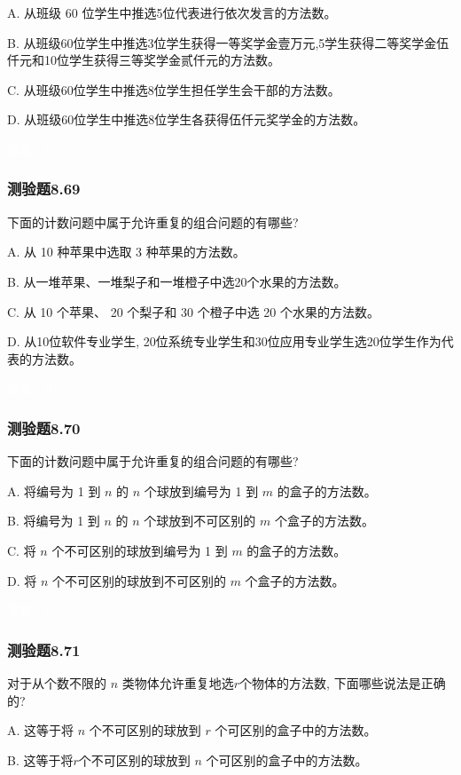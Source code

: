 \documentclass[UTF8, heading=true]{ctexart}
\begin{document}
A. 从班级 60 位学生中推选5位代表进行依次发言的方法数。

B. 从班级60位学生中推选3位学生获得一等奖学金壹万元,5学生获得二等奖学金伍仟元和10位学生获得三等奖学金贰仟元的方法数。

C. 从班级60位学生中推选8位学生担任学生会干部的方法数。

D. 从班级60位学生中推选8位学生各获得伍仟元奖学金的方法数。

\textcolor{white}{答案：B}

\subsubsection{测验题8.69}

下面的计数问题中属于允许重复的组合问题的有哪些?

A. 从 10 种苹果中选取 3 种苹果的方法数。

B. 从一堆苹果、一堆梨子和一堆橙子中选20个水果的方法数。

C. 从 10 个苹果、 20 个梨子和 30 个橙子中选 20 个水果的方法数。

D. 从10位软件专业学生, 20位系统专业学生和30位应用专业学生选20位学生作为代表的方法数。

\textcolor{white}{答案：BC}


\subsubsection{测验题8.70}

下面的计数问题中属于允许重复的组合问题的有哪些?

A. 将编号为 1 到 $n$ 的 $n$ 个球放到编号为 1 到 $m$ 的盒子的方法数。

B. 将编号为 1 到 $n$ 的 $n$ 个球放到不可区别的 $m$ 个盒子的方法数。

C. 将 $n$ 个不可区别的球放到编号为 1 到 $m$ 的盒子的方法数。

D. 将 $n$ 个不可区别的球放到不可区别的 $m$ 个盒子的方法数。

\textcolor{white}{答案：C}

\subsubsection{测验题8.71}

对于从个数不限的 $n$ 类物体允许重复地选$r$个物体的方法数, 下面哪些说法是正确的?

A. 这等于将 $n$ 个不可区别的球放到 $r$ 个可区别的盒子中的方法数。

B. 这等于将$r$个不可区别的球放到 $n$ 个可区别的盒子中的方法数。
\end{document}
